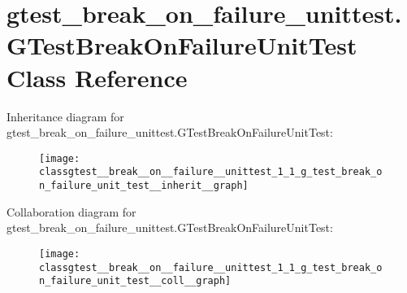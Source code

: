 \hypertarget{classgtest__break__on__failure__unittest_1_1_g_test_break_on_failure_unit_test}{}\section{gtest\+\_\+break\+\_\+on\+\_\+failure\+\_\+unittest.\+G\+Test\+Break\+On\+Failure\+Unit\+Test Class Reference}
\label{classgtest__break__on__failure__unittest_1_1_g_test_break_on_failure_unit_test}


Inheritance diagram for gtest\+\_\+break\+\_\+on\+\_\+failure\+\_\+unittest.\+G\+Test\+Break\+On\+Failure\+Unit\+Test\+:
\nopagebreak
\begin{figure}[H]
\begin{center}
\leavevmode
\texttt{[image: classgtest\_\_break\_\_on\_\_failure\_\_unittest\_1\_1\_g\_test\_break\_on\_failure\_unit\_test\_\_inherit\_\_graph]}
\end{center}
\end{figure}


Collaboration diagram for gtest\+\_\+break\+\_\+on\+\_\+failure\+\_\+unittest.\+G\+Test\+Break\+On\+Failure\+Unit\+Test\+:
\nopagebreak
\begin{figure}[H]
\begin{center}
\leavevmode
\texttt{[image: classgtest\_\_break\_\_on\_\_failure\_\_unittest\_1\_1\_g\_test\_break\_on\_failure\_unit\_test\_\_coll\_\_graph]}
\end{center}
\end{figure}
